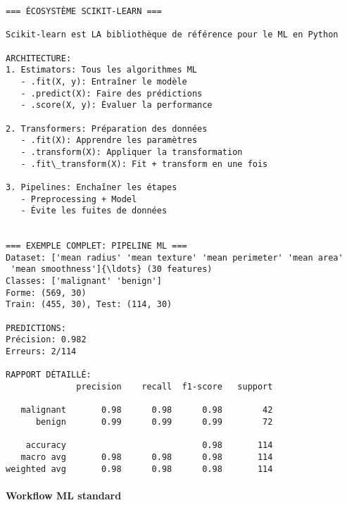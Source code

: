 \documentclass[11pt]{article}
\begin{document}
    \begin{Verbatim}[commandchars=\\\{\}]
=== ÉCOSYSTÈME SCIKIT-LEARN ===

Scikit-learn est LA bibliothèque de référence pour le ML en Python

ARCHITECTURE:
1. Estimators: Tous les algorithmes ML
   - .fit(X, y): Entraîner le modèle
   - .predict(X): Faire des prédictions
   - .score(X, y): Évaluer la performance

2. Transformers: Préparation des données
   - .fit(X): Apprendre les paramètres
   - .transform(X): Appliquer la transformation
   - .fit\_transform(X): Fit + transform en une fois

3. Pipelines: Enchaîner les étapes
   - Preprocessing + Model
   - Évite les fuites de données


=== EXEMPLE COMPLET: PIPELINE ML ===
Dataset: ['mean radius' 'mean texture' 'mean perimeter' 'mean area'
 'mean smoothness']{\ldots} (30 features)
Classes: ['malignant' 'benign']
Forme: (569, 30)
Train: (455, 30), Test: (114, 30)

PREDICTIONS:
Précision: 0.982
Erreurs: 2/114

RAPPORT DÉTAILLÉ:
              precision    recall  f1-score   support

   malignant       0.98      0.98      0.98        42
      benign       0.99      0.99      0.99        72

    accuracy                           0.98       114
   macro avg       0.98      0.98      0.98       114
weighted avg       0.98      0.98      0.98       114

    \end{Verbatim}

    \paragraph{Workflow ML standard}\label{workflow-ml-standard}
\end{document}
